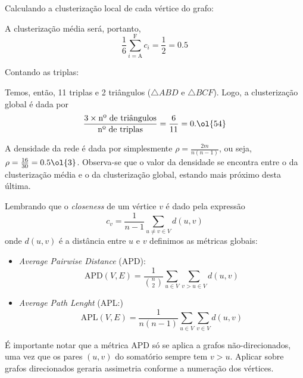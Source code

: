 \documentclass[l15, tikzdraw]{homework}
\begin{document}
	
	\subquest{}%
	Calculando a clusterização local de cada vértice do grafo:
	
	\begin{fig}
		
	\end{fig}

	A clusterização média será, portanto,
	$$\frac{1}{6} \sum_{i = \text{A}}^{\text{F}} c_i = \frac{1}{2} = 0.5$$

	\subquest{}%
	Contando as triplas:
	
	\begin{fig}
		
	\end{fig}

	Temos, então, 11 triplas e 2 triângulos ($\triangle ABD$ e $\triangle BCF$). Logo, a clusterização global é dada por
	$$\frac{3 \times \text{nº de triângulos}}{\text{nº de triplas}} = \frac{6}{11} = 0.\ol{54} $$

	\subquest{}%
	A densidade da rede é dada por simplesmente $\rho = \frac{2m}{n (n - 1)}$, ou seja, $\rho = \frac{16}{30} = 0.5\ol{3}$. Observa-se que o valor da densidade se encontra entre o da clusterização média e o da clusterização global, estando mais próximo desta última.


	Lembrando que o \textit{closeness} de um vértice $v$ é dado pela expressão
		$$c_v = \frac{1}{n - 1} \sum_{u \neq v \in V} d(u, v)$$
	onde $d(u, v)$ é a distância entre $u$ e $v$ definimos as métricas globais:
	\begin{itemize}
		\item \textit{Average Pairwise Distance} (APD): 
			$$\text{APD}(V, E) = \frac{1}{\binom{n}{2}} \sum_{u \in V} \sum_{v > u \in V} d(u, v)$$
		\item \textit{Average Path Lenght} (APL:) 
			$$\text{APL}(V, E) = \frac{1}{n (n - 1)} \sum_{u \in V} \sum_{v \in V} d(u, v)$$
	\end{itemize}
	É importante notar que a métrica APD só se aplica a grafos não-direcionados, uma vez que os pares $(u, v)$ do somatório sempre tem $v > u$. Aplicar sobre grafos direcionados geraria assimetria conforme a numeração dos vértices.
\end{document}
